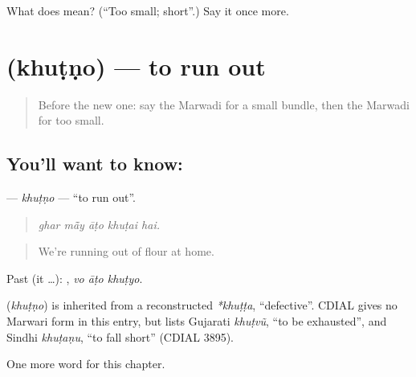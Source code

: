 \begin{tcolorbox}[breakable,colback=teal!4,colframe=teal!35!black,title={Before you move on}]
What does  mean? (\textquotedblleft{}Too small; short\textquotedblright{}.) Say it once more.
\end{tcolorbox}
\section[\texorpdfstring{\mw{खुटणो} (khuṭṇo)}{खुटणो (khuṭṇo)}]{ (khuṭṇo) — to run out}

\label{lesson:MW-C215-khutno}



\begin{quote}
Before the new one: say the Marwadi for a small bundle, then the Marwadi for too small.
\end{quote}

\subsection*{You'll want to know: }
\textbf{} — \emph{khuṭṇo} — \textquotedblleft{}to run out\textquotedblright{}.

\begin{quote}
    
\end{quote}

\begin{quote}
\emph{ghar mā̃y āṭo khuṭai hai.}
\end{quote}

\begin{quote}
We're running out of flour at home.
\end{quote}

Past (it …):   , \emph{vo āṭo khuṭyo}.

\begin{cousinweb}
\textbf{} (\emph{khuṭṇo}) is inherited from a reconstructed \emph{*khuṭṭa}, \textquotedblleft{}defective\textquotedblright{}. CDIAL gives no Marwari form in this entry, but lists Gujarati \emph{khuṭvũ}, \textquotedblleft{}to be exhausted\textquotedblright{}, and Sindhi \emph{khuṭaṇu}, \textquotedblleft{}to fall short\textquotedblright{} (CDIAL 3895).
\end{cousinweb}

\begin{grammarlens}[title={What you've built}]
One more word for this chapter.
\end{grammarlens}

